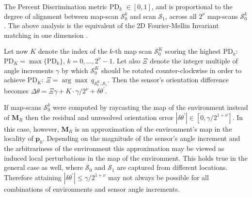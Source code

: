 The Percent Discrimination metric PD$_k$ $\in [0,1]$, and is proportional to
the degree of alignment between map-scan $\mathcal{S}_0^k$ and
scan $\mathcal{S}_1$, across all $2^\nu$ map-scans $\mathcal{S}_0^k$.
The above analysis is the equivalent of the 2D Fourier-Mellin Invariant
matching in one dimension \cite{Qin-ShengChen1994}.

Let now $K$ denote the index of the $k$-th map scan
$\mathcal{S}_0^K$ scoring the highest PD$_k$: $\text{PD}_K =
\max \{\text{PD}_k\}$, $k = 0,\dots,2^\nu-1$. Let also $\Xi$ denote the integer
multiple of angle increments $\gamma$ by which $\mathcal{S}_0^K$
should be rotated counter-clockwise in order to achieve PD$_K$:
$\Xi = \arg\max\ q_{\mathcal{S}_0^K, \mathcal{S}_1}$.  Then the sensor's
orientation difference becomes
$\Delta\theta = \Xi\gamma + K \cdot \gamma/2^\nu + \delta\theta^\prime$.

If map-scans $\mathcal{S}_0^k$ were computed by raycasting the map of the
environment instead of $\bm{M}_R$ then the residual and unresolved orientation
error $|\delta\theta^\prime| \in [0,\gamma / 2^{1+\nu}]$. In this case, however,
$\bm{M}_R$ is an approximation of the environment's map in the locality of
$\bm{p}_0$. Depending on the magnitude of the sensor's angle increment and
the arbitrariness of the environment this approximation may be viewed as
induced local perturbations in the map of the environment. This holds true
in the general case as well, where $\mathcal{S}_0$ and $\mathcal{S}_1$ are
captured from different locations. Therefore attaining
$|\delta\theta^\prime| \leq \gamma / 2^{1+\nu}$ may not always be possible
for all combinations of environments and sensor angle increments.
